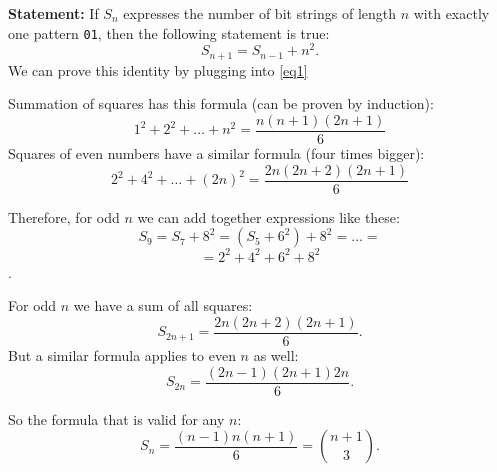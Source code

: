 \documentclass[jou]{apa6}
\begin{document}
{\bf Statement:} If $S_n$ expresses the number of bit strings of length $n$ with exactly 
one pattern {\tt 01}, then the following statement is true:
$$S_{n+1} = S_{n-1} + n^2.$$
We can prove this identity by plugging into \ref{eq1}

Summation of squares has this formula (can be proven by induction):
$$1^2 + 2^2 + \ldots + n^2 = \frac{n(n+1)(2n+1)}{6}$$
Squares of even numbers have a similar formula (four times bigger):
$$2^2 + 4^2 + \ldots + (2n)^2 = \frac{2n(2n+2)(2n+1)}{6}$$

Therefore, for odd $n$ we can add together expressions like these: 
$$S_9 = S_7 + 8^2 = (S_5 + 6^2) + 8^2 = \ldots = $$
$$ = 2^2 + 4^2 + 6^2 + 8^2$$.

For odd $n$ we have a sum of all squares:
$$S_{2n+1} = \frac{2n(2n+2)(2n+1)}{6}.$$
But a similar formula applies to even $n$ as well:
$$S_{2n} = \frac{(2n-1)(2n+1)2n}{6}.$$

So the formula that is valid for any $n$: 
$$S_n = \frac{(n-1)n(n+1)}{6} = {{n+1} \choose 3}.$$
\end{document}
